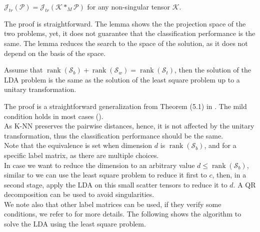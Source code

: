 \documentclass{siamltex}
\begin{document}
\begin{lemma}
$\mathcal{J}_{tr}(\mathcal{P})=\mathcal{J}_{tr}(\mathcal{K} *_M \mathcal{P})$ for any non-singular tensor $\mathcal{K}$.\\
\end{lemma}
The proof is straightforward. The lemma shows the the projection space of the two problems, yet, it does not guarantee that the classification performance is the same.
The lemma reduces the search to the space of the solution, as it does not depend on the basis of the space.
\begin{proposition}
Assume that $\operatorname{rank}(\mathcal{S}_b)+ \operatorname{rank}(\mathcal{S}_w)=\operatorname{rank}(\mathcal{S}_t)$, then the solution of the LDA problem is the same as the solution of the least square problem up to a unitary transformation.\\
\end{proposition}
\noindent
The proof is a straightforward generalization from Theorem (5.1) in \cite{ye2007least}. The mild condition holds in most cases (\cite{ye2007least}). \\
As K-NN preserves the pairwise distances, hence, it is not affected by the unitary transformation, thus the classification performance should be the same.\\
Note that the equivalence is set when dimension $d$ is $\operatorname{rank}(\mathcal{S}_b)$, and for a specific label matrix, as there are multiple choices.\\
In case we want to reduce the dimension to an arbitrary value $d \leq \operatorname{rank}(\mathcal{S}_b)$, similar to \cite{lee2015equivalence} we can use the least square problem to reduce it first to $c$, then, in a second stage, apply the LDA on this small scatter tensors to reduce it to $d$. A QR decomposition can be used to avoid singularities.\\
We note also that other label matrices can be used, if they verify some conditions, we refer to \cite{lee2015equivalence} for more details.
The following shows the algorithm to solve the LDA using the least square problem. 
\end{document}
